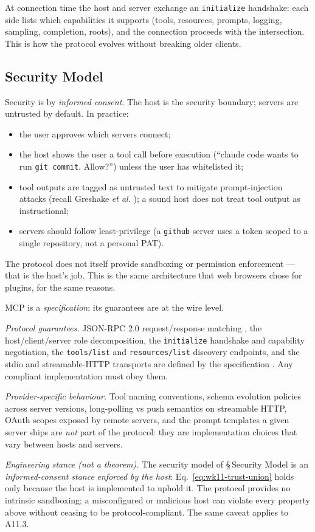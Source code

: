 At connection time the host and server exchange an
\texttt{initialize} handshake: each side lists which capabilities
it supports (tools, resources, prompts, logging, sampling,
completion, roots), and the connection proceeds with the
intersection. This is how the protocol evolves without breaking
older clients.

\subsection{Security Model}

Security is by \emph{informed consent}. The host is the security
boundary; servers are untrusted by default. In practice:
\begin{itemize}
  \item the user approves which servers connect;
  \item the host shows the user a tool call before execution
        (``claude code wants to run \texttt{git commit}. Allow?'')
        unless the user has whitelisted it;
  \item tool outputs are tagged as untrusted text to mitigate
        prompt-injection attacks (recall Greshake \emph{et al.}
        \citep{greshake2023injection}); a sound host does not
        treat tool output as instructional;
  \item servers should follow least-privilege (a \texttt{github}
        server uses a token scoped to a single repository, not a
        personal PAT).
\end{itemize}

The protocol does not itself provide sandboxing or permission
enforcement --- that is the host's job. This is the same
architecture that web browsers chose for plugins, for the same
reasons.

\begin{provedassumed}
MCP is a \emph{specification}; its guarantees are at the wire
level.

\emph{Protocol guarantees.} JSON-RPC 2.0 request/response
matching \citep{json_rpc_spec}, the host/client/server role
decomposition, the \texttt{initialize} handshake and capability
negotiation, the \texttt{tools/list} and
\texttt{resources/list} discovery endpoints, and the stdio and
streamable-HTTP transports are defined by the specification
\citep{mcp_spec}. Any compliant implementation must obey them.

\emph{Provider-specific behaviour.} Tool naming conventions,
schema evolution policies across server versions, long-polling
vs push semantics on streamable HTTP, OAuth scopes exposed by
remote servers, and the prompt templates a given server ships
are \emph{not} part of the protocol: they are implementation
choices that vary between hosts and servers.

\emph{Engineering stance (not a theorem).} The security model
of \S\,Security Model is an \emph{informed-consent stance}
\emph{enforced by the host}: Eq.~\eqref{eq:wk11-trust-union} holds
only because the host is implemented to uphold it. The protocol
provides no intrinsic sandboxing; a misconfigured or malicious
host can violate every property above without ceasing to be
protocol-compliant. The same caveat applies to A11.3.
\end{provedassumed}

